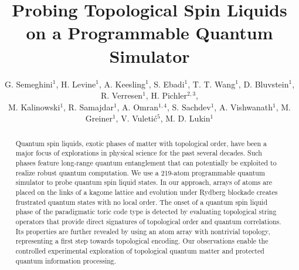 \documentclass[twocolumn,amssymb,secnumarabic, prl, aps, nofootinbib]{revtex4-1}
\begin{document}
\title{Probing Topological Spin Liquids on a Programmable Quantum Simulator}

\author
{G. Semeghini$^{1}$,  H. Levine$^{1}$, A. Keesling$^{1}$, S. Ebadi$^{1}$, T. T. Wang$^{1}$, D. Bluvstein$^{1}$, R. Verresen$^{1}$, H. Pichler$^{2,3}$, \\ M. Kalinowski$^{1}$, R. Samajdar$^{1}$, A. Omran$^{1,4}$, S. Sachdev$^{1}$, A. Vishwanath$^{1}$, M. Greiner$^{1}$, V. Vuleti\'{c}$^{5}$, M. D. Lukin$^{1}$}


\begin{abstract}
    Quantum spin liquids, exotic phases of matter with topological order, have been a major focus of explorations in physical science for the past several decades. Such phases feature long-range quantum entanglement that can potentially be exploited to realize robust quantum computation. We use a 219-atom programmable quantum simulator to probe quantum spin liquid states. In our approach, arrays of atoms are placed on the links of a kagome lattice and evolution under Rydberg blockade creates frustrated quantum states with no local order. The onset of a quantum spin liquid phase of the paradigmatic toric code type is detected by evaluating topological string operators that provide direct signatures of topological order and quantum correlations. Its properties are further revealed by using an atom array with nontrivial topology, representing a first step towards topological encoding. Our observations enable the controlled experimental exploration of topological quantum matter and  protected quantum information processing.
\end{abstract}

\maketitle 
\end{document}

